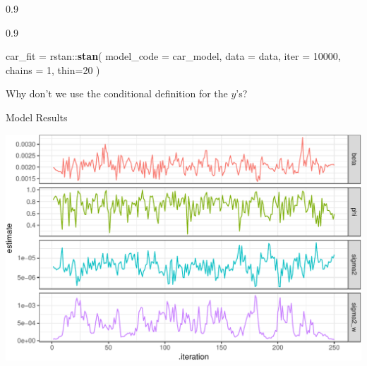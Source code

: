 \documentclass[11pt,ignorenonframetext,]{beamer}
\newenvironment{Shaded}{}{}
\newcommand{\DataTypeTok}[1]{\textcolor[rgb]{0.56,0.13,0.00}{#1}}
\newcommand{\DecValTok}[1]{\textcolor[rgb]{0.25,0.63,0.44}{#1}}
\newcommand{\KeywordTok}[1]{\textcolor[rgb]{0.00,0.44,0.13}{\textbf{#1}}}
\newcommand{\NormalTok}[1]{#1}
\newcommand{\OperatorTok}[1]{\textcolor[rgb]{0.40,0.40,0.40}{#1}}
\newcommand{\StringTok}[1]{\textcolor[rgb]{0.25,0.44,0.63}{#1}}
\let\oldShaded\Shaded
\let\endoldShaded\endShaded
\renewenvironment{Shaded}{\footnotesize\begin{spacing}{0.9}\oldShaded}{\endoldShaded\end{spacing}}
\begin{document}
\begin{frame}[fragile]{}
\protect\hypertarget{section-4}{}

\begin{Shaded}
\end{Shaded}

\begin{Shaded}
\begin{Highlighting}[]
\NormalTok{car_fit =}\StringTok{ }\NormalTok{rstan}\OperatorTok{::}\KeywordTok{stan}\NormalTok{(}
  \DataTypeTok{model_code =}\NormalTok{ car_model, }\DataTypeTok{data =}\NormalTok{ data,}
  \DataTypeTok{iter =} \DecValTok{10000}\NormalTok{, }\DataTypeTok{chains =} \DecValTok{1}\NormalTok{, }\DataTypeTok{thin=}\DecValTok{20}
\NormalTok{)}
\end{Highlighting}
\end{Shaded}

\pause

\vspace{10mm}

Why don’t we use the conditional definition for the \(y\)’s?

\end{frame}

\begin{frame}{Model Results}
\protect\hypertarget{model-results}{}

\begin{center}\includegraphics[width=\textwidth]{Lec18_files/figure-beamer/unnamed-chunk-24-1} \end{center}

\end{frame}
\end{document}
